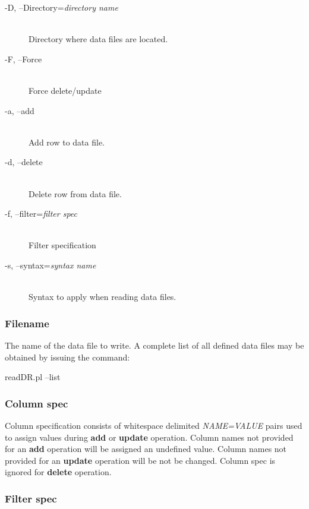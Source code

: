 \begin{description}

\item[-D, --Directory={\em directory name\/}]%
\hfil\\
Directory where data files are located.

\item[-F, --Force]%
\hfil\\
Force delete/update

\item[-a, --add]%
\hfil\\
Add row to data file.

\item[-d, --delete]%
\hfil\\
Delete row from data file.

\item[-f, --filter={\em filter spec\/}]%
\hfil\\
Filter specification

\item[-s, --syntax={\em syntax name\/}]%
\hfil\\
Syntax to apply when reading data files.

\end{description}

\subsubsection*{Filename}%

The name of the data file to write. A complete list of all defined data files may
be obtained by issuing the command:

readDR.pl --list

\subsubsection*{Column spec}%

Column specification consists of whitespace delimited {\em NAME=VALUE\/} pairs
used to assign values during {\bf add} or {\bf update} operation. Column names
not provided for an {\bf add} operation will be assigned an undefined value.
Column names not provided for an {\bf update} operation will be not be changed.
Column spec is ignored for {\bf delete} operation.

\subsubsection*{Filter spec}%

